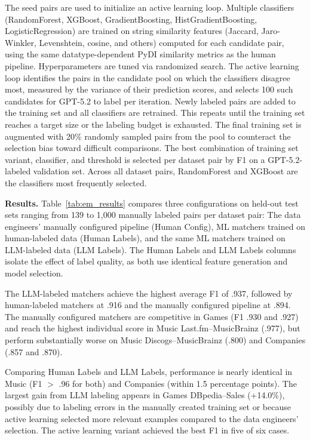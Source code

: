 The seed pairs are used to initialize an active learning loop. Multiple classifiers (RandomForest, XGBoost, GradientBoosting, HistGradientBoosting, LogisticRegression) are trained on string similarity features (Jaccard, Jaro-Winkler, Levenshtein, cosine, and others) computed for each candidate pair, using the same datatype-dependent PyDI similarity metrics as the human pipeline. Hyperparameters are tuned via randomized search. The active learning loop identifies the pairs in the candidate pool on which the classifiers disagree most, measured by the variance of their prediction scores, and selects 100 such candidates for GPT-5.2 to label per iteration. Newly labeled pairs are added to the training set and all classifiers are retrained. This repeats until the training set reaches a target size or the labeling budget is exhausted. The final training set is augmented with 20\% randomly sampled pairs from the pool to counteract the selection bias toward difficult comparisons. The best combination of training set variant, classifier, and threshold is selected per dataset pair by F1 on a GPT-5.2-labeled validation set. Across all dataset pairs, RandomForest and XGBoost are the classifiers most frequently selected.




\textbf{Results.}
\label{sec:em_results}
Table~\ref{tab:em_results} compares three configurations on held-out test sets ranging from 139 to 1,000 manually labeled pairs per dataset pair: The data engineers' manually configured pipeline (Human Config), ML matchers trained on human-labeled data (Human Labels), and the same ML matchers trained on LLM-labeled data (LLM Labels). The Human Labels and LLM Labels columns isolate the effect of label quality, as both use identical feature generation and model selection.

The LLM-labeled matchers achieve the highest average F1 of .937, followed by human-labeled matchers at .916 and the manually configured pipeline at .894. The manually configured matchers are competitive in Games (F1 .930 and .927) and reach the highest individual score in Music Last.fm--MusicBrainz (.977), but perform substantially worse on Music Discogs--MusicBrainz (.800) and Companies (.857 and .870). 

Comparing Human Labels and LLM Labels, performance is nearly identical in Music (F1 $>$ .96 for both) and Companies (within 1.5 percentage points). The largest gain from LLM labeling appears in Games DBpedia--Sales (+14.0\%), possibly due to labeling errors in the manually created training set or because active learning selected more relevant examples compared to the data engineers' selection. The active learning variant achieved the best F1 in five of six cases.



